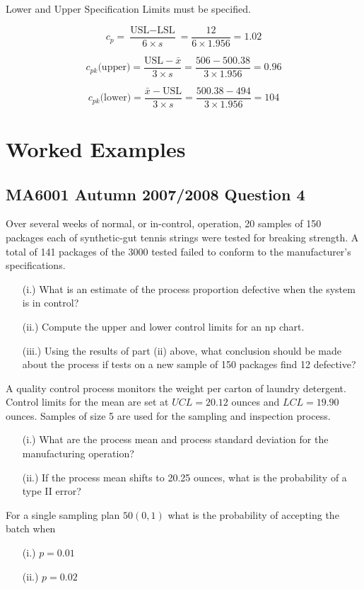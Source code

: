\documentclass[]{report}
\begin{document}
Lower and Upper Specification Limits must be specified.

\[  c_p = \frac{\mbox{USL} - \mbox{LSL} }{6 \times s} = \frac{12}{6 \times 1.956} = 1.02 \]

\[  c_{pk}\mbox{(upper)} = \frac{\mbox{USL} - \bar{x} }{3 \times s} = \frac{506-500.38}{3 \times 1.956} = 0.96\]

\[  c_{pk}\mbox{(lower)} =\frac{ \bar{x} -\mbox{USL}} {3 \times s} = \frac{500.38-494}{3 \times 1.956} = 104\]
\section{Worked Examples}
\subsection{MA6001 Autumn 2007/2008 Question 4}
Over several weeks of normal, or in-control, operation, 20 samples of 150 packages each of synthetic-gut tennis strings were tested for breaking strength. A total of 141 packages of the 3000 tested failed to conform to the manufacturer's specifications.		

\begin{itemize}
	\item[(i.)]	What is an estimate of the process proportion defective when the system is in control?		
	\item[(ii.)] Compute the upper and lower control limits for an np chart.	
	\item[(iii.)] Using the results of part (ii) above, what conclusion should be made about the process if tests on a new sample of 150 packages find 12 defective?
\end{itemize}

A quality control process monitors the weight per carton of laundry detergent. Control limits for the mean are set at $UCL = 20.12$ ounces and $LCL = 19.90$ ounces. Samples of size 5 are used for the sampling and inspection process.

\begin{itemize}
	\item[(i.)] What are the process mean and process standard deviation for the manufacturing operation?		
	\item[(ii.)] If the process mean shifts to 20.25 ounces, what is the probability of a type II error?		
\end{itemize}

For a single sampling plan $50(0,1)$ what is the probability of accepting the batch when
\begin{itemize}
	\item[(i.)] $p = 0.01$
	\item[(ii.)] $p = 0.02$		
\end{itemize}
\end{document}
